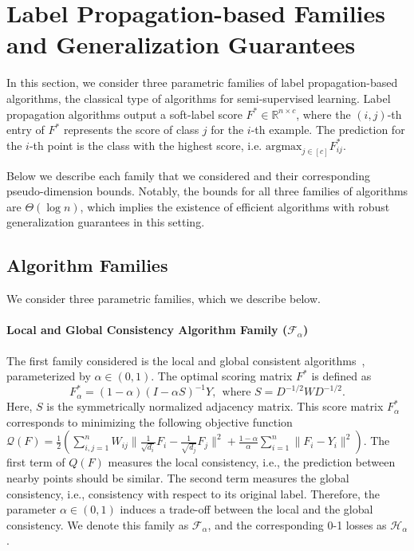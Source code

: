 \section{Label Propagation-based Families and  Generalization Guarantees}
\label{sec:label_prop}

In this section, we consider three parametric families of label propagation-based algorithms, the classical type of algorithms for semi-supervised learning. 
%
Label propagation algorithms output a soft-label score $F^* \in \mathbb{R}^{n \times c}$, where the $(i,j)$-th entry of $F^*$ represents the score of class $j$ for the $i$-th example. The prediction for the $i$-th point is the class with the highest score, i.e. $\text{argmax}_{j \in [c]} F^*_{ij}$. 

Below we describe each family that we considered and their corresponding pseudo-dimension bounds.
Notably, the bounds for all three families of algorithms are  $\Theta(\log n)$, which implies the existence of efficient algorithms with robust generalization guarantees in this setting.

\subsection{Algorithm Families}
We consider three parametric families, which we describe below. 

\paragraph{Local and Global Consistency Algorithm Family ($\mathcal{F}_\alpha$)} 
The first family considered is the local and global consistent algorithms~\citep{zhou2003learning}, parameterized by $\alpha \in (0,1)$.
The optimal scoring matrix $F^*$
is defined as
\[F^*_\alpha = (1- \alpha)(I - \alpha S)^{-1} Y, ~~\text{where }S = D^{-1/2}WD^{-1/2}. \]
Here, $S$ is the symmetrically normalized adjacency matrix. 
This score matrix $F^*_\alpha$ corresponds to minimizing the following objective function
$
    \mathcal{Q}(F) 
    = \frac{1}{2} ( \sum_{i, j=1}^nW_{ij} \| \frac{1}{\sqrt{d_{i}}}F_i - \frac{1}{\sqrt{d_{j}}}F_j\|^2
    + \frac{1-\alpha}{\alpha}\sum_{i=1}^n \|F_i - Y_i\|^2 ).
$
The first term of $Q(F)$ measures the local consistency, i.e., the prediction between nearby points should be similar. The second term measures the global consistency, i.e., consistency with respect to its original label. Therefore, the parameter $\alpha \in (0,1)$ induces a trade-off between the local and the global consistency.
We denote this family as $\mathcal{F}_\alpha$, and the corresponding 0-1 losses as $\mathcal{H}_\alpha$.

